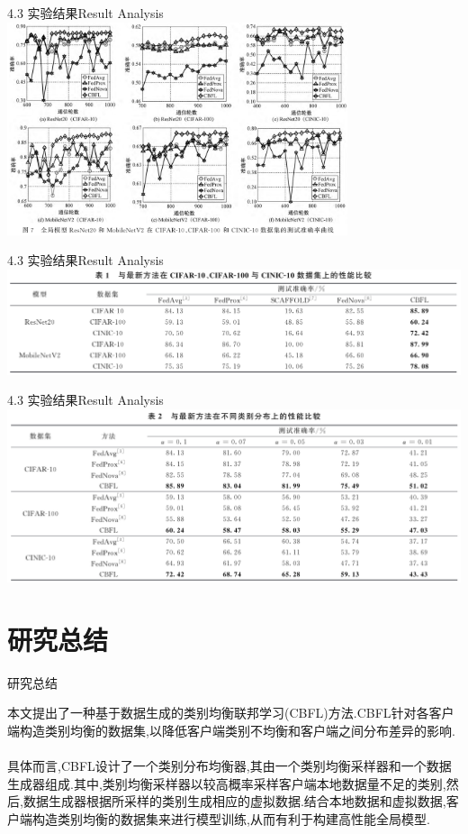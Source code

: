 \documentclass{sintefbeamer}
\theoremstyle{definition}
\begin{document}
\begin{frame}{4.3 实验结果}{Result Analysis}
	\includegraphics[width=0.75\textwidth]{images/img_expr3}
\end{frame}

\begin{frame}{4.3 实验结果}{Result Analysis}
	\includegraphics[width=1.\textwidth]{images/img_expr2}
\end{frame}

\begin{frame}{4.3 实验结果}{Result Analysis}
	\includegraphics[width=1.\textwidth]{images/img_expr4}
\end{frame}



\section{研究总结}

\begin{frame}{研究总结}

本文提出了一种基于数据生成的类别均衡联邦学习(CBFL)方法.CBFL针对各客户端构造类别均衡的数据集,以降低客户端类别不均衡和客户端之间分布差异的影响.
\\ \hspace*{\fill} \\
具体而言,CBFL设计了一个类别分布均衡器,其由一个类别均衡采样器和一个数据生成器组成.其中,类别均衡采样器以较高概率采样客户端本地数据量不足的类别,然后,数据生成器根据所采样的类别生成相应的虚拟数据.结合本地数据和虚拟数据,客户端构造类别均衡的数据集来进行模型训练,从而有利于构建高性能全局模型.
\end{frame}



\backmatter
\end{document}
